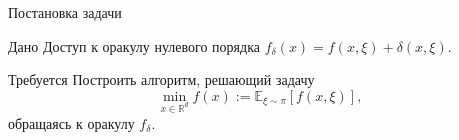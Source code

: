 \documentclass{beamer}
\begin{document}


%
%




\begin{frame}{Постановка задачи}
\begin{block}{Дано}
    Доступ к оракулу нулевого порядка $f_\delta(x) = f(x, \xi) + \delta(x, \xi)$.
\end{block}
\begin{block}{Требуется}
 Построить алгоритм, решающий задачу
 $$\min\limits_{x \in \mathbb{R}^d} f(x) := \mathbb{E}_{\xi \sim \pi}[f(x, \xi)], \label{stochactic_proble`m}$$
 обращаясь к оракулу $f_\delta$.
\end{block}

\end{frame}
\end{document}
